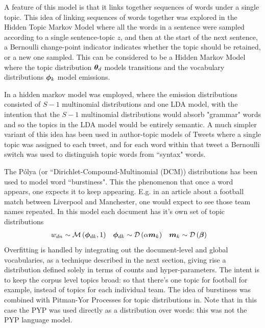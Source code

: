 A feature of this model is that it links together sequences of words under a single topic. This idea of linking sequences of words together was explored in the Hidden Topic Markov Model\cite{Gruber2007} where all the words in a sentence were sampled according to a single sentence-topic $z$, and then at the start of the next sentence, a Bernoulli change-point indicator indicates whether the topic should be retained, or a new one sampled. This can be considered to be a Hidden Markov Model where the topic distribution ${ \bm \theta_d }$ models transitions and the vocabulary distributions $\bm \phi_k$ model emissions. 

In \cite{Griffiths2005} a hidden markov model was employed, where the emission distributions consisted of $S-1$ multinomial distributions and one LDA model, with the intention that the $S-1$ multinomial distributions would absorb "grammar" words and so the topics in the LDA model would be entirely semantic. A much simpler variant of this idea has been used in author-topic models of Tweets\cite{Zhao2011}\cite{Zhao2011a} where a single topic was assigned to each tweet, and for each word within that tweet a Bernoulli switch was used to distinguish topic words from ``syntax" words.

The P\'olya (or ``Dirichlet-Compound-Multinomial (DCM)) distributions has been used to model word ``burstiness"\cite{Madsen2005}. This the phenomenon that once a word appears, one expects it to keep appearing. E.g. in an article about a football match between Liverpool and Manchester, one would expect to see those team names repeated. In this model each document has it's own set of topic distributions
\begin{align}
w_{dn} & \sim \mathcal{M} \left( {\bm \phi_{dk}},{1} \right) &
\bm \phi_{dk} & \sim \mathcal{D} \left( {\alpha \bm m_k} \right) &
\bm m_k & \sim \mathcal{D} \left( {\bm \beta} \right)
\end{align}
Overfitting is handled by integrating out the document-level and global vocabularies, as a technique described in the next section, giving rise a distribution defined solely in terms of counts and hyper-parameters. The intent is to keep the corpus level topics broad: so that there's one topic for football for example, instead of topics for each individual team. The idea of burstiness was combined with Pitman-Yor Processes for topic distributions in\cite{Buntine2014}. Note that in this case the PYP was used directly as a distribution over words: this was not the PYP language model.

